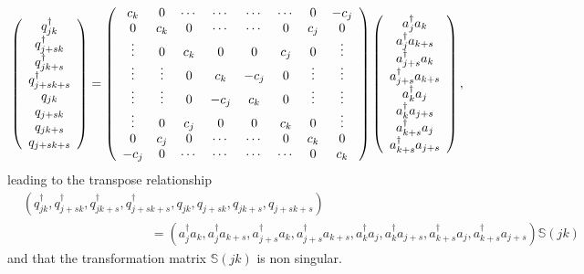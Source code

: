 \documentclass[aps,preprint]{revtex4}%
\begin{document}
\begin{equation}
\left(
\begin{array}
[c]{c}%
q_{jk}^{\dagger}\\
q_{j+sk}^{\dagger}\\
q_{jk+s}^{\dagger}\\
q_{j+sk+s}^{\dagger}\\
q_{jk}\\
q_{j+sk}\\
q_{jk+s}\\
q_{j+sk+s}%
\end{array}
\right)  =\left(
\begin{array}
[c]{cccccccc}%
c_{k} & 0 & \cdots & \cdots & \cdots & \cdots & 0 & -c_{j}\\
0 & c_{k} & 0 & \cdots & \cdots & 0 & c_{j} & 0\\
\vdots & 0 & c_{k} & 0 & 0 & c_{j} & 0 & \vdots\\
\vdots & \vdots & 0 & c_{k} & -c_{j} & 0 & \vdots & \vdots\\
\vdots & \vdots & 0 & -c_{j} & c_{k} & 0 & \vdots & \vdots\\
\vdots & 0 & c_{j} & 0 & 0 & c_{k} & 0 & \vdots\\
0 & c_{j} & 0 & \cdots & \cdots & 0 & c_{k} & 0\\
-c_{j} & 0 & \cdots & \cdots & \cdots & \cdots & 0 & c_{k}%
\end{array}
\right)  \left(
\begin{array}
[c]{c}%
a_{j}^{\dagger}a_{k}\\
a_{j}^{\dagger}a_{k+s}\\
a_{j+s}^{\dagger}a_{k}\\
a_{j+s}^{\dagger}a_{k+s}\\
a_{k}^{\dagger}a_{j}\\
a_{k}^{\dagger}a_{j+s}\\
a_{k+s}^{\dagger}a_{j}\\
a_{k+s}^{\dagger}a_{j+s}%
\end{array}
\right)  ,
\end{equation}
leading to the transpose relationship
\begin{align}
&  \left(  q_{jk}^{\dagger},q_{j+sk}^{\dagger},q_{jk+s}^{\dagger}%
,q_{j+sk+s}^{\dagger},q_{jk},q_{j+sk},q_{jk+s},q_{j+sk+s}\right) \nonumber\\
&  \qquad\qquad\qquad\qquad\qquad\left.  =\right.  \left(  a_{j}^{\dagger
}a_{k},a_{j}^{\dagger}a_{k+s},a_{j+s}^{\dagger}a_{k},a_{j+s}^{\dagger}%
a_{k+s},a_{k}^{\dagger}a_{j},a_{k}^{\dagger}a_{j+s},a_{k+s}^{\dagger}%
a_{j},a_{k+s}^{\dagger}a_{j+s}\right)  \mathbb{S}\left(  jk\right)
\end{align}
and that the transformation matrix $\mathbb{S}\left(  jk\right)  $ is non singular.
\end{document}
